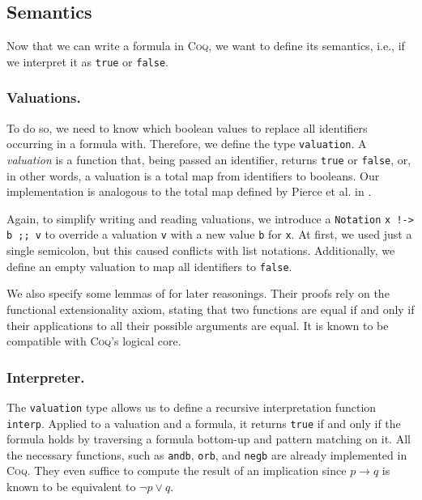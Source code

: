 \subsection{Semantics}

Now that we can write a formula in \textsc{Coq}, we want to define its semantics, i.e., if we interpret it as \texttt{true} or \texttt{false}.

\subsubsection{Valuations.} %

To do so, we need to know which boolean values to replace all identifiers occurring in a formula with.
Therefore, we define the type \texttt{valuation}. 
A \emph{valuation} is a function that, being passed an identifier, returns \texttt{true} or \texttt{false}, or, in other words, a valuation is a total map from identifiers to booleans. 
Our implementation is analogous to the total map defined by Pierce et al. in \cite{pierceSF}.

Again, to simplify writing and reading valuations, we introduce a \texttt{Notation} \texttt{x !-> b ;; v} to override a valuation \texttt{v} with a new value \texttt{b} for \texttt{x}. 
At first, we used just a single semicolon, but this caused conflicts with list notations. 
Additionally, we define an empty valuation to map all identifiers to \texttt{false}.

We also specify some lemmas of \cite{pierceSF} for later reasonings. 
Their proofs rely on the functional extensionality axiom, stating that two functions are equal if and only if their applications to all their possible arguments are equal. 
It is known to be compatible with \textsc{Coq}'s logical core.

\subsubsection{Interpreter.}

The \texttt{valuation} type allows us to define a recursive interpretation function \texttt{interp}.
Applied to a valuation and a formula, it returns \texttt{true} if and only if the formula holds by traversing a formula bottom-up and pattern matching on it.
All the necessary functions, such as \texttt{andb}, \texttt{orb}, and \texttt{negb} are already implemented in \textsc{Coq}. 
They even suffice to compute the result of an implication since $p \rightarrow q$ is known to be equivalent to $\neg p \lor q$.

